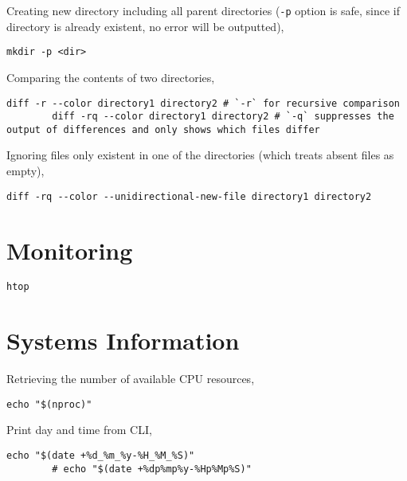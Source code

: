 \documentclass[12pt, a4paper]{scrbook}
\numberwithin{equation}{section}
\theoremstyle{definition}
\theoremstyle{definition}
\begin{document}
	Creating new directory including all parent directories (\texttt{-p} option is safe, since if directory is already existent, 
	no error will be outputted),
	
	\begin{lstlisting}[style=mystylebash, label=alg:bash__dir_creation, xleftmargin=\parindent]
		mkdir -p <dir>
	\end{lstlisting}
	
	Comparing the contents of two directories,
	
	\begin{lstlisting}[style=mystylebash, label=alg:bash_diff__dir, xleftmargin=\parindent]
		diff -r --color directory1 directory2 # `-r` for recursive comparison
		diff -rq --color directory1 directory2 # `-q` suppresses the output of differences and only shows which files differ
	\end{lstlisting}
	
	Ignoring files only existent in one of the directories (which treats absent files as empty),
	
	\begin{lstlisting}[style=mystylebash, label=alg:, xleftmargin=\parindent]
		diff -rq --color --unidirectional-new-file directory1 directory2 
	\end{lstlisting}

	\section{Monitoring}
	
	\begin{lstlisting}[style=mystylebash, label=alg:htop, xleftmargin=\parindent]
		htop
	\end{lstlisting}

	\section{Systems Information}
	
	Retrieving the number of available CPU resources,
	
	\begin{lstlisting}[style=mystylebash, label=alg:nproc, xleftmargin=\parindent]
		echo "$(nproc)"
	\end{lstlisting}

	Print day and time from CLI,
	
	\begin{lstlisting}[style=mystylebash, label=alg:cli_date, xleftmargin=\parindent]
		echo "$(date +%d_%m_%y-%H_%M_%S)"
		# echo "$(date +%dp%mp%y-%Hp%Mp%S)"
	\end{lstlisting}
\end{document}
